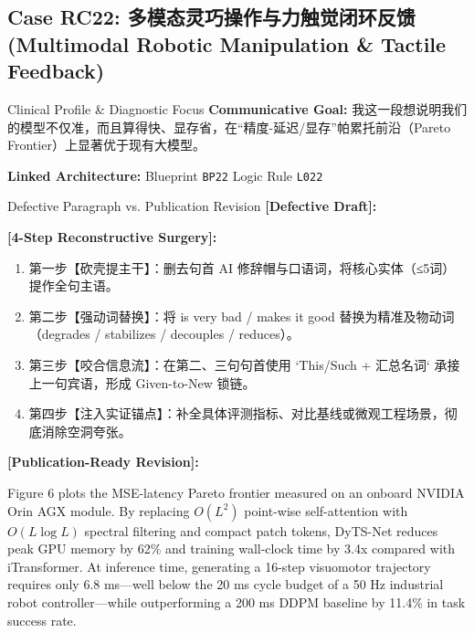 \subsection{Case RC22: 多模态灵巧操作与力触觉闭环反馈 (Multimodal Robotic Manipulation \& Tactile Feedback)}\label{case:RC22}
\begin{ConceptBox}{Clinical Profile \& Diagnostic Focus}
\textbf{Communicative Goal:} 我这一段想说明我们的模型不仅准，而且算得快、显存省，在“精度-延迟/显存”帕累托前沿（Pareto Frontier）上显著优于现有大模型。\par
\textbf{Linked Architecture:} Blueprint \texttt{BP22} \enspace\textbar\enspace Logic Rule \texttt{L022}
\end{ConceptBox}
\begin{ExampleBox}{Defective Paragraph vs. Publication Revision}
\textbf{\color{TargetHighlight}[Defective Draft]:}\par
{}\par\vspace{6pt}
\textbf{\color{AcadForest}[4-Step Reconstructive Surgery]:}
\begin{enumerate}[label=\textbf{\color{AcadNavy}Step \arabic*:}, leftmargin=2em]
  \item 第一步【砍壳提主干】：删去句首 AI 修辞帽与口语词，将核心实体（≤5词）提作全句主语。
  \item 第二步【强动词替换】：将 is very bad / makes it good 替换为精准及物动词（degrades / stabilizes / decouples / reduces）。
  \item 第三步【咬合信息流】：在第二、三句句首使用 `This/Such + 汇总名词` 承接上一句宾语，形成 Given-to-New 锁链。
  \item 第四步【注入实证锚点】：补全具体评测指标、对比基线或微观工程场景，彻底消除空洞夸张。
\end{enumerate}\vspace{4pt}
\textbf{\color{AcadNavy}[Publication-Ready Revision]:}\par
Figure 6 plots the MSE-latency Pareto frontier measured on an onboard NVIDIA Orin AGX module. By replacing $O(L^2)$ point-wise self-attention with $O(L \log L)$ spectral filtering and compact patch tokens, DyTS-Net reduces peak GPU memory by 62\% and training wall-clock time by 3.4x compared with iTransformer. At inference time, generating a 16-step visuomotor trajectory requires only 6.8 ms---well below the 20 ms cycle budget of a 50 Hz industrial robot controller---while outperforming a 200 ms DDPM baseline by 11.4\% in task success rate.
\end{ExampleBox}
